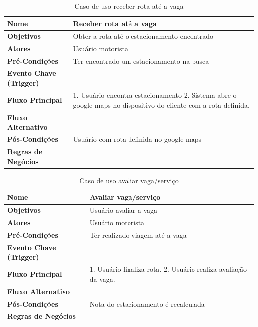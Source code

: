 \begin{table}[H]
\begin{center}
\caption{Caso de uso receber rota até a vaga}
\label{tab:caso-uso-receber-rota}
\begin{tabular}{|p{4cm}|p{9cm}|}
\hline
\textbf{Nome} & Receber rota até a vaga \\
\hline
\textbf{Objetivos} & Obter a rota até o estacionamento encontrado \\
\hline
\textbf{Atores} & Usuário motorista \\
\hline
\textbf{Pré-Condições} & Ter encontrado um estacionamento na busca \\
\hline
\textbf{Evento Chave (Trigger)} & \\
\hline
\textbf{Fluxo Principal} & 1. Usuário encontra estacionamento 2. Sistema abre o google maps no dispositivo do cliente com a rota definida. \\
\hline
\textbf{Fluxo Alternativo} & \\
\hline
\textbf{Pós-Condições} & Usuário com rota definida no google maps \\
\hline
\textbf{Regras de Negócios} & \\
\hline
\end{tabular}
\end{center}
\end{table}

\begin{table}[H]
\begin{center}
\caption{Caso de uso avaliar vaga/serviço}
\label{tab:caso-uso-avaliar}
\begin{tabular}{|p{4cm}|p{9cm}|}
\hline
\textbf{Nome} & Avaliar vaga/serviço \\
\hline
\textbf{Objetivos} & Usuário avaliar a vaga \\
\hline
\textbf{Atores} & Usuário motorista \\
\hline
\textbf{Pré-Condições} & Ter realizado viagem até a vaga \\
\hline
\textbf{Evento Chave (Trigger)} & \\
\hline
\textbf{Fluxo Principal} & 1. Usuário finaliza rota. 2. Usuário realiza avaliação da vaga. \\
\hline
\textbf{Fluxo Alternativo} & \\
\hline
\textbf{Pós-Condições} & Nota do estacionamento é recalculada \\
\hline
\textbf{Regras de Negócios} & \\
\hline
\end{tabular}
\end{center}
\end{table}


